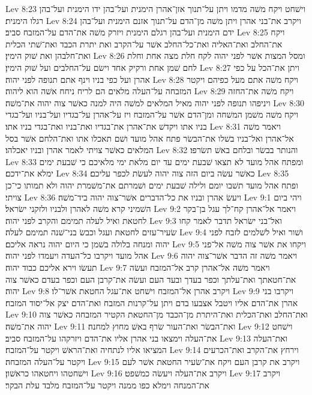 Lev 8:23  וישׁחט ויקח משׁה מדמו ויתן על־תנוך אזן־אהרן הימנית ועל־בהן ידו הימנית ועל־בהן רגלו הימנית׃
Lev 8:24  ויקרב את־בני אהרן ויתן משׁה מן־הדם על־תנוך אזנם הימנית ועל־בהן ידם הימנית ועל־בהן רגלם הימנית ויזרק משׁה את־הדם על־המזבח סביב׃
Lev 8:25  ויקח את־החלב ואת־האליה ואת־כל־החלב אשׁר על־הקרב ואת יתרת הכבד ואת־שׁתי הכלית ואת־חלבהן ואת שׁוק הימין׃
Lev 8:26  ומסל המצות אשׁר לפני יהוה לקח חלת מצה אחת וחלת לחם שׁמן אחת ורקיק אחד וישׂם על־החלבים ועל שׁוק הימין׃
Lev 8:27  ויתן את־הכל על כפי אהרן ועל כפי בניו וינף אתם תנופה לפני יהוה׃
Lev 8:28  ויקח משׁה אתם מעל כפיהם ויקטר המזבחה על־העלה מלאים הם לריח ניחח אשׁה הוא ליהוה׃
Lev 8:29  ויקח משׁה את־החזה ויניפהו תנופה לפני יהוה מאיל המלאים למשׁה היה למנה כאשׁר צוה יהוה את־משׁה׃
Lev 8:30  ויקח משׁה משׁמן המשׁחה ומן־הדם אשׁר על־המזבח ויז על־אהרן על־בגדיו ועל־בניו ועל־בגדי בניו אתו ויקדשׁ את־אהרן את־בגדיו ואת־בניו ואת־בגדי בניו אתו׃
Lev 8:31  ויאמר משׁה אל־אהרן ואל־בניו בשׁלו את־הבשׂר פתח אהל מועד ושׁם תאכלו אתו ואת־הלחם אשׁר בסל המלאים כאשׁר צויתי לאמר אהרן ובניו יאכלהו׃
Lev 8:32  והנותר בבשׂר ובלחם באשׁ תשׂרפו׃
Lev 8:33  ומפתח אהל מועד לא תצאו שׁבעת ימים עד יום מלאת ימי מלאיכם כי שׁבעת ימים ימלא את־ידכם׃
Lev 8:34  כאשׁר עשׂה ביום הזה צוה יהוה לעשׂת לכפר עליכם׃
Lev 8:35  ופתח אהל מועד תשׁבו יומם ולילה שׁבעת ימים ושׁמרתם את־משׁמרת יהוה ולא תמותו כי־כן צויתי׃
Lev 8:36  ויעשׂ אהרן ובניו את כל־הדברים אשׁר־צוה יהוה ביד־משׁה׃
Lev 9:1  ויהי ביום השׁמיני קרא משׁה לאהרן ולבניו ולזקני ישׂראל׃
Lev 9:2  ויאמר אל־אהרן קח־לך עגל בן־בקר לחטאת ואיל לעלה תמימם והקרב לפני יהוה׃
Lev 9:3  ואל־בני ישׂראל תדבר לאמר קחו שׂעיר־עזים לחטאת ועגל וכבשׂ בני־שׁנה תמימם לעלה׃
Lev 9:4  ושׁור ואיל לשׁלמים לזבח לפני יהוה ומנחה בלולה בשׁמן כי היום יהוה נראה אליכם׃
Lev 9:5  ויקחו את אשׁר צוה משׁה אל־פני אהל מועד ויקרבו כל־העדה ויעמדו לפני יהוה׃
Lev 9:6  ויאמר משׁה זה הדבר אשׁר־צוה יהוה תעשׂו וירא אליכם כבוד יהוה׃
Lev 9:7  ויאמר משׁה אל־אהרן קרב אל־המזבח ועשׂה את־חטאתך ואת־עלתך וכפר בעדך ובעד העם ועשׂה את־קרבן העם וכפר בעדם כאשׁר צוה יהוה׃
Lev 9:8  ויקרב אהרן אל־המזבח וישׁחט את־עגל החטאת אשׁר־לו׃
Lev 9:9  ויקרבו בני אהרן את־הדם אליו ויטבל אצבעו בדם ויתן על־קרנות המזבח ואת־הדם יצק אל־יסוד המזבח׃
Lev 9:10  ואת־החלב ואת־הכלית ואת־היתרת מן־הכבד מן־החטאת הקטיר המזבחה כאשׁר צוה יהוה את־משׁה׃
Lev 9:11  ואת־הבשׂר ואת־העור שׂרף באשׁ מחוץ למחנה׃
Lev 9:12  וישׁחט את־העלה וימצאו בני אהרן אליו את־הדם ויזרקהו על־המזבח סביב׃
Lev 9:13  ואת־העלה המציאו אליו לנתחיה ואת־הראשׁ ויקטר על־המזבח׃
Lev 9:14  וירחץ את־הקרב ואת־הכרעים ויקטר על־העלה המזבחה׃
Lev 9:15  ויקרב את קרבן העם ויקח את־שׂעיר החטאת אשׁר לעם וישׁחטהו ויחטאהו כראשׁון׃
Lev 9:16  ויקרב את־העלה ויעשׂה כמשׁפט׃
Lev 9:17  ויקרב את־המנחה וימלא כפו ממנה ויקטר על־המזבח מלבד עלת הבקר׃
